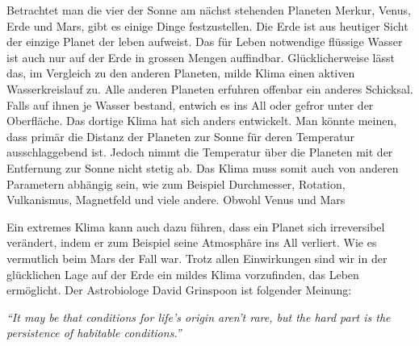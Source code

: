 \begin{refsection}

Betrachtet man die vier der Sonne am nächst stehenden Planeten Merkur, Venus, Erde und Mars, gibt es einige Dinge festzustellen.
Die Erde ist aus heutiger Sicht der einzige Planet der leben aufweist. Das für Leben notwendige flüssige Wasser ist auch nur auf der Erde in grossen Mengen auffindbar. Glücklicherweise lässt das, im Vergleich zu den anderen Planeten, milde Klima einen aktiven Wasserkreislauf zu. Alle anderen Planeten erfuhren offenbar ein anderes Schicksal. Falls auf ihnen je Wasser bestand, entwich es ins All oder gefror unter der Oberfläche. Das dortige Klima hat sich anders entwickelt.
Man könnte meinen, dass primär die Distanz der Planeten zur Sonne für deren Temperatur ausschlaggebend ist. Jedoch nimmt die Temperatur über die Planeten mit der Entfernung zur Sonne nicht stetig ab. Das Klima muss somit auch von anderen Parametern abhängig sein, wie zum Beispiel Durchmesser, Rotation, Vulkanismus, Magnetfeld und viele andere. Obwohl Venus und Mars 


Ein extremes Klima kann auch dazu führen, dass ein Planet sich irreversibel verändert, indem er zum Beispiel seine Atmosphäre ins All verliert. Wie es vermutlich beim Mars der Fall war. Trotz allen Einwirkungen sind wir in der glücklichen Lage auf der Erde ein mildes Klima vorzufinden, das Leben ermöglicht. Der Astrobiologe David Grinspoon ist folgender Meinung:

\vspace{5pt}
\textit{“It may be that conditions for life’s origin aren’t rare, but the hard part is the persistence of habitable conditions.”} \\
\vspace{5pt}


\end{refsection}
